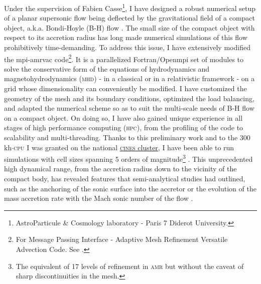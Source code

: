 \documentclass[a4paper,12pt,onecolumn]{article}
\begin{document}
\indent Under the supervision of Fabien Casse\footnote{AstroParticule \& Cosmology laboratory - Paris 7 Diderot University.}, I have designed a robust numerical setup of a planar supersonic flow being deflected by the gravitational field of a compact object, a.k.a. Bondi-Hoyle (B-H) flow \cite{Hoyle:1939fl,Bondi1944}. The small size of the compact object with respect to its accretion radius has long made numerical simulations of this flow prohibitively time-demanding. To address this issue, I have extensively modified the {\sc mpi-amrvac} code\footnote{For Message Passing Interface - Adaptive Mesh Refinement Versatile Advection Code. See \cite{Porth:2014wv}.}. It is a parallelized Fortran/Open{\sc mpi} set of modules to solve the conservative form of the equations of hydrodynamics and magnetohydrodynamics (\textsc{mhd}) - in a classical or in a relativistic framework - on a grid whose dimensionality can conveniently be modified. I have customized the geometry of the mesh and its boundary conditions, optimized the load balancing, and adapted the numerical scheme so as to suit the multi-scale needs of B-H flow on a compact object. On doing so, I have also gained unique experience in all stages of high performance computing (\textsc{hpc}), from the profiling of the code to scalability and multi-threading. Thanks to this preliminary work and to the 300 kh$\cdot$\textsc{cpu} I was granted on the national \href{https://www.cines.fr/en/}{\textsc{cines} cluster}, I have been able to run simulations with cell sizes spanning 5 orders of magnitude\footnote{The equivalent of 17 levels of refinement in \textsc{amr} but without the caveat of sharp discontinuities in the mesh.} \cite{ElMellah2015}. This unprecedented high dynamical range, from the accretion radius down to the vicinity of the compact body, has revealed features that semi-analytical studies had outlined, such as the anchoring of the sonic surface into the accretor or the evolution of the mass accretion rate with the Mach sonic number of the flow \cite{Foglizzo1996}.\\
\end{document}
